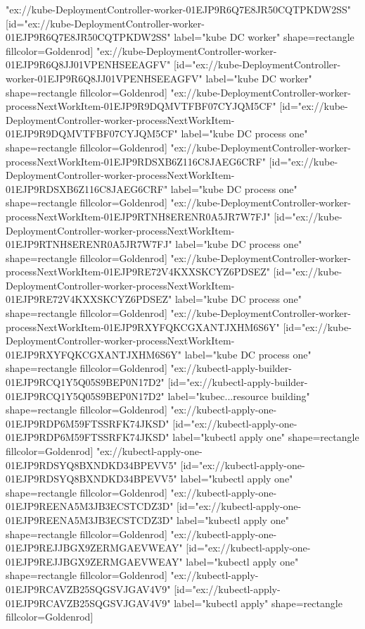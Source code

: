 {"ex://kube-DeploymentController-worker-01EJP9R6Q7E8JR50CQTPKDW2SS" [id="ex://kube-DeploymentController-worker-01EJP9R6Q7E8JR50CQTPKDW2SS" label="kube DC worker" shape=rectangle fillcolor=Goldenrod]
"ex://kube-DeploymentController-worker-01EJP9R6Q8JJ01VPENHSEEAGFV" [id="ex://kube-DeploymentController-worker-01EJP9R6Q8JJ01VPENHSEEAGFV" label="kube DC worker" shape=rectangle fillcolor=Goldenrod]
"ex://kube-DeploymentController-worker-processNextWorkItem-01EJP9R9DQMVTFBF07CYJQM5CF" [id="ex://kube-DeploymentController-worker-processNextWorkItem-01EJP9R9DQMVTFBF07CYJQM5CF" label="kube DC process one" shape=rectangle fillcolor=Goldenrod]
"ex://kube-DeploymentController-worker-processNextWorkItem-01EJP9RDSXB6Z116C8JAEG6CRF" [id="ex://kube-DeploymentController-worker-processNextWorkItem-01EJP9RDSXB6Z116C8JAEG6CRF" label="kube DC process one" shape=rectangle fillcolor=Goldenrod]
"ex://kube-DeploymentController-worker-processNextWorkItem-01EJP9RTNH8ERENR0A5JR7W7FJ" [id="ex://kube-DeploymentController-worker-processNextWorkItem-01EJP9RTNH8ERENR0A5JR7W7FJ" label="kube DC process one" shape=rectangle fillcolor=Goldenrod]
"ex://kube-DeploymentController-worker-processNextWorkItem-01EJP9RE72V4KXXSKCYZ6PDSEZ" [id="ex://kube-DeploymentController-worker-processNextWorkItem-01EJP9RE72V4KXXSKCYZ6PDSEZ" label="kube DC process one" shape=rectangle fillcolor=Goldenrod]
"ex://kube-DeploymentController-worker-processNextWorkItem-01EJP9RXYFQKCGXANTJXHM6S6Y" [id="ex://kube-DeploymentController-worker-processNextWorkItem-01EJP9RXYFQKCGXANTJXHM6S6Y" label="kube DC process one" shape=rectangle fillcolor=Goldenrod]
"ex://kubectl-apply-builder-01EJP9RCQ1Y5Q05S9BEP0N17D2" [id="ex://kubectl-apply-builder-01EJP9RCQ1Y5Q05S9BEP0N17D2" label="kubec...resource building" shape=rectangle fillcolor=Goldenrod]
"ex://kubectl-apply-one-01EJP9RDP6M59FTSSRFK74JKSD" [id="ex://kubectl-apply-one-01EJP9RDP6M59FTSSRFK74JKSD" label="kubectl apply one" shape=rectangle fillcolor=Goldenrod]
"ex://kubectl-apply-one-01EJP9RDSYQ8BXNDKD34BPEVV5" [id="ex://kubectl-apply-one-01EJP9RDSYQ8BXNDKD34BPEVV5" label="kubectl apply one" shape=rectangle fillcolor=Goldenrod]
"ex://kubectl-apply-one-01EJP9REENA5M3JB3ECSTCDZ3D" [id="ex://kubectl-apply-one-01EJP9REENA5M3JB3ECSTCDZ3D" label="kubectl apply one" shape=rectangle fillcolor=Goldenrod]
"ex://kubectl-apply-one-01EJP9REJJBGX9ZERMGAEVWEAY" [id="ex://kubectl-apply-one-01EJP9REJJBGX9ZERMGAEVWEAY" label="kubectl apply one" shape=rectangle fillcolor=Goldenrod]
"ex://kubectl-apply-01EJP9RCAVZB25SQGSVJGAV4V9" [id="ex://kubectl-apply-01EJP9RCAVZB25SQGSVJGAV4V9" label="kubectl apply" shape=rectangle fillcolor=Goldenrod]
}
